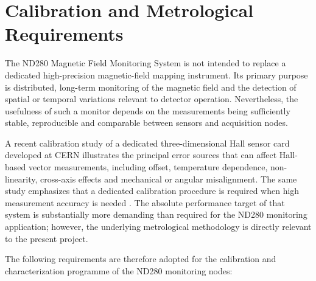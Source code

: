 \section{Calibration and Metrological Requirements}

The ND280 Magnetic Field Monitoring System is not intended to replace a dedicated high-precision magnetic-field mapping instrument. Its primary purpose is distributed, long-term monitoring of the magnetic field and the detection of spatial or temporal variations relevant to detector operation. Nevertheless, the usefulness of such a monitor depends on the measurements being sufficiently stable, reproducible and comparable between sensors and acquisition nodes.

A recent calibration study of a dedicated three-dimensional Hall sensor card developed at CERN illustrates the principal error sources that can affect Hall-based vector measurements, including offset, temperature dependence, non-linearity, cross-axis effects and mechanical or angular misalignment. The same study emphasizes that a dedicated calibration procedure is required when high measurement accuracy is needed \cite{MessnerHallCalibration}. The absolute performance target of that system is substantially more demanding than required for the ND280 monitoring application; however, the underlying metrological methodology is directly relevant to the present project.

The following requirements are therefore adopted for the calibration and characterization programme of the ND280 monitoring nodes:

